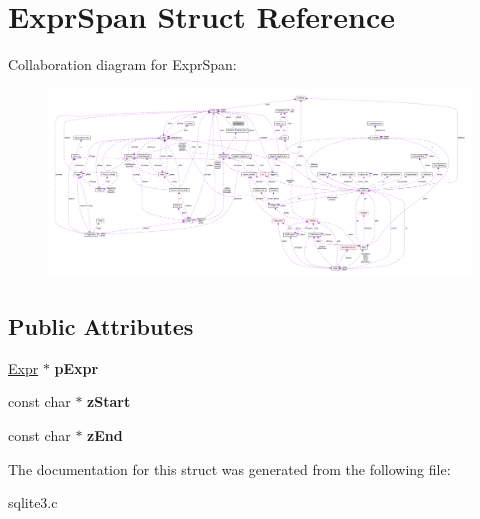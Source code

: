 \hypertarget{struct_expr_span}{\section{Expr\-Span Struct Reference}
\label{struct_expr_span}
}


Collaboration diagram for Expr\-Span\-:\nopagebreak
\begin{figure}[H]
\begin{center}
\leavevmode
\includegraphics[width=350pt]{struct_expr_span__coll__graph}
\end{center}
\end{figure}
\subsection*{Public Attributes}
\begin{DoxyCompactItemize}
\item 
\hypertarget{struct_expr_span_a081c4aa031331c8518c1173b2a8335cc}{\hyperlink{struct_expr}{Expr} $\ast$ {\bfseries p\-Expr}}\label{struct_expr_span_a081c4aa031331c8518c1173b2a8335cc}

\item 
\hypertarget{struct_expr_span_af4653638d7e67a62e7a607f682b38e25}{const char $\ast$ {\bfseries z\-Start}}\label{struct_expr_span_af4653638d7e67a62e7a607f682b38e25}

\item 
\hypertarget{struct_expr_span_a7cdf42cea729fcb5a1c477c3825ab575}{const char $\ast$ {\bfseries z\-End}}\label{struct_expr_span_a7cdf42cea729fcb5a1c477c3825ab575}

\end{DoxyCompactItemize}


The documentation for this struct was generated from the following file\-:\begin{DoxyCompactItemize}
\item 
sqlite3.\-c\end{DoxyCompactItemize}
